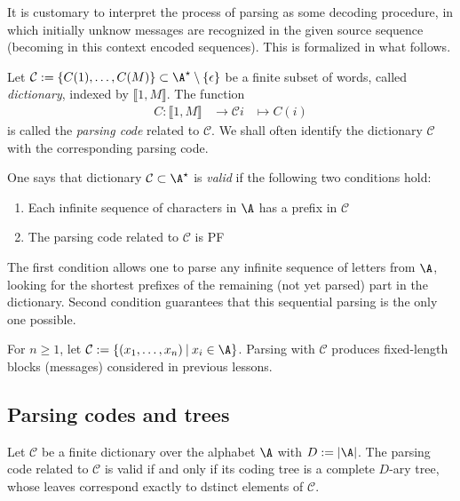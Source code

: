 \documentclass[toc]{../cs-classes/cs-classes}
\begin{document}
It is customary to interpret the process of parsing as some decoding procedure, in which initially unknow messages are recognized in the given source sequence (becoming in this  context encoded sequences). This is formalized in what follows.

\begin{definition}
    Let $\mathcal{C} := \{C(1), \dots, C(M)\} \subset \A^\star\setminus\{\epsilon\}$ be a finite subset of words, called \emph{dictionary}, indexed by $\llbracket 1, M\rrbracket$. The function
    \begin{equation*}
        \begin{aligned}
            C : \llbracket 1, M\rrbracket &\to \mathcal{C}
            i &\mapsto C(i)
        \end{aligned}
    \end{equation*}
    is called the \emph{parsing code} related to $\mathcal{C}$. We shall often identify the dictionary $\mathcal{C}$ with the corresponding parsing code.
\end{definition}

\begin{definition}
    One says that dictionary $\mathcal{C} \subset \A^\star$ is \emph{valid} if the following two conditions hold:
    \begin{enumerate}
        \item Each infinite sequence of characters in $\A$ has a prefix in $\mathcal{C}$
        \item The parsing code related to $\mathcal{C}$ is PF
    \end{enumerate}
\end{definition}
The first condition allows one to parse any infinite sequence of letters from $\A$, looking for the shortest prefixes of the remaining (not yet parsed) part in the dictionary. Second condition guarantees that this sequential parsing is the only one possible.

\begin{example}
    For $n\geq1$, let $\mathcal{C} := \{(x_1, \dots, x_n) \: | \: x_i \in \A\}$. Parsing with $\mathcal{C}$ produces fixed-length blocks (messages) considered in previous lessons.
\end{example}

\subsection{Parsing codes and trees}
\begin{lemma}
    Let $\mathcal{C}$ be a finite dictionary over the alphabet $\A$ with $D:=|\A|$. The parsing code related to $\mathcal{C}$ is valid if and only if its coding tree is a complete $D$-ary tree, whose leaves correspond exactly to dstinct elements of $\mathcal{C}$.
\end{lemma}
\end{document}
